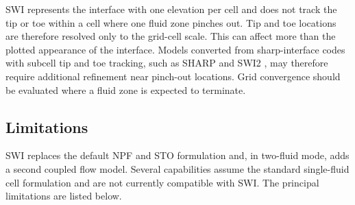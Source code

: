 SWI represents the interface with one elevation per cell and does not track the tip or toe within a cell where one fluid zone pinches out. Tip and toe locations are therefore resolved only to the grid-cell scale. This can affect more than the plotted appearance of the interface. Models converted from sharp-interface codes with subcell tip and toe tracking, such as SHARP \citep{essaid1990} and SWI2 \citep{bakker2013documentation}, may therefore require additional refinement near pinch-out locations. Grid convergence should be evaluated where a fluid zone is expected to terminate.

\subsection{Limitations}
\label{sec:swi-limitations}

SWI replaces the default NPF and STO formulation and, in two-fluid mode, adds a second coupled flow model. Several \mf capabilities assume the standard single-fluid cell formulation and are not currently compatible with SWI. The principal limitations are listed below.

